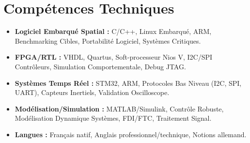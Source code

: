 \documentclass[a4paper,11pt]{article}
\begin{document}
\section{Comp\'etences Techniques}
\begin{itemize}[leftmargin=*, nosep]
    \item \small{\textbf{Logiciel Embarqu\'e Spatial :} C/C++, Linux Embarqu\'e, ARM, Benchmarking Cibles, Portabilit\'e Logiciel, Syst\`emes Critiques.}
    \item \small{\textbf{FPGA/RTL :} VHDL, Quartus, Soft-processeur Nios V, I2C/SPI Contrôleurs, Simulation Comportementale, Debug JTAG.}
    \item \small{\textbf{Syst\`emes Temps R\'eel :} STM32, ARM, Protocoles Bas Niveau (I2C, SPI, UART), Capteurs Inertiels, Validation Oscilloscope.}
    \item \small{\textbf{Mod\'elisation/Simulation :} MATLAB/Simulink, Contr\^ole Robuste, Modélisation Dynamique Syst\`emes, FDI/FTC, Traitement Signal.}
    \item \small{\textbf{Langues :} Fran\c{c}ais natif, Anglais professionnel/technique, Notions allemand.}
\end{itemize}
\end{document}
